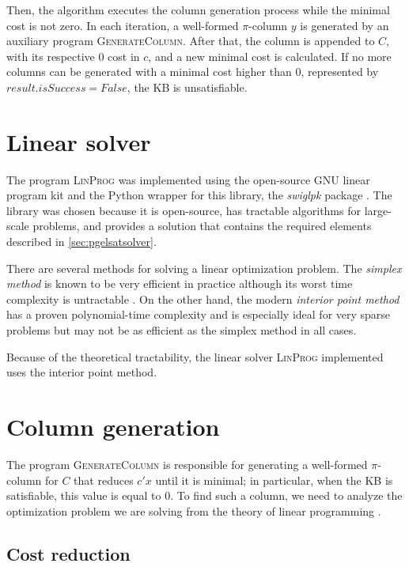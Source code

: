Then, the algorithm executes the column generation process while the minimal cost is not zero. In each iteration, a well-formed $\pi$-column $y$ is generated by an auxiliary program \textsc{GenerateColumn}. After that, the column is appended to $C$, with its respective $0$ cost in $c$, and a new minimal cost is calculated. If no more columns can be generated with a minimal cost higher than $0$, represented by $result.isSuccess = False$, the KB is unsatisfiable.

\section{Linear solver}
The program \textsc{LinProg} was implemented using the open-source GNU linear program kit \citep{makhorin2001gnu} and the Python wrapper for this library, the \emph{swiglpk} package \citep{swiglpk}. The library was chosen because it is open-source, has tractable algorithms for large-scale problems, and provides a solution that contains the required elements described in \autoref{sec:pgelsatsolver}.

There are several methods for solving a linear optimization problem. The \emph{simplex method} is known to be very efficient in practice \citep{borgwardt2012simplex} although its worst time complexity is untractable \citep{klee1972good}. On the other hand, the modern \emph{interior point method} has a proven polynomial-time complexity and is especially ideal for very sparse problems \citep{boyd2004convex} but may not be as efficient as the simplex method in all cases.

Because of the theoretical tractability, the linear solver \textsc{LinProg} implemented uses the interior point method.

\section{Column generation}
The program \textsc{GenerateColumn} is responsible for generating a well-formed $\pi$-column for $C$ that reduces $c' x$ until it is minimal; in particular, when the KB is satisfiable, this value is equal to 0. To find such a column, we need to analyze the optimization problem we are solving from the theory of linear programming \citep{bertsimas1997introduction}.

\subsection{Cost reduction}

